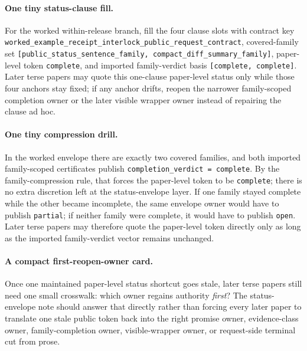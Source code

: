 \documentclass[11pt]{article}
\begin{document}
\paragraph{One tiny status-clause fill.}
For the worked within-release branch, fill the four clause slots with contract key \nolinkurl{worked\_example\_receipt\_interlock\_public\_request\_contract}, covered-family set \nolinkurl{[public\_status\_sentence\_family, compact\_diff\_summary\_family]}, paper-level token \texttt{complete}, and imported family-verdict basis \nolinkurl{[complete, complete]}. Later terse papers may quote this one-clause paper-level status only while those four anchors stay fixed; if any anchor drifts, reopen the narrower family-scoped completion owner or the later visible wrapper owner instead of repairing the clause ad hoc.\cite{series:workedexample}

\paragraph{One tiny compression drill.}
In the worked envelope there are exactly two covered families, and both imported family-scoped certificates publish \texttt{completion\_verdict = complete}. By the family-compression rule, that forces the paper-level token to be \texttt{complete}; there is no extra discretion left at the status-envelope layer. If one family stayed complete while the other became incomplete, the same envelope owner would have to publish \texttt{partial}; if neither family were complete, it would have to publish \texttt{open}. Later terse papers may therefore quote the paper-level token directly only as long as the imported family-verdict vector remains unchanged.\cite{series:workedexample}

\paragraph{A compact first-reopen-owner card.}
Once one maintained paper-level status shortcut goes stale, later terse papers still need one small crosswalk: which owner regains authority \emph{first}? The status-envelope note should answer that directly rather than forcing every later paper to translate one stale public token back into the right promise owner, evidence-class owner, family-completion owner, visible-wrapper owner, or request-side terminal cut from prose.
\end{document}
